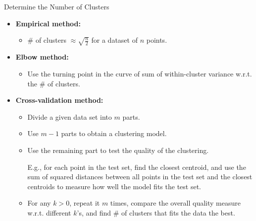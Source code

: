 \begin{frame}{Determine the Number of Clusters}
	\begin{itemize}
		\item \textbf{Empirical method:}
		\begin{itemize}
			\item $\#$ of clusters $\approx \sqrt{\frac{n}{2}}$ for a dataset
			of $n$ points.
		\end{itemize}
		\item \textbf{Elbow method:}
		\begin{itemize}
			\item Use the turning point in the curve of sum of within-cluster
			variance w.r.t. the $\#$ of clusters.
		\end{itemize}
		\item \textbf{Cross-validation method:}
		\begin{itemize}
			\item Divide a given data set into $m$ parts.
			\item Use $m-1$ parts to obtain a clustering model.
			\item Use the remaining part to test the quality of the clustering.

              E.g., for each point in the test set, find the closest centroid,
              and use the sum of squared distances between all points in the
              test set and the closest centroids to measure how well the model
              fits the test set.
			\item For any $k > 0$, repeat it $m$ times, compare the overall
			quality measure w.r.t. different $k$'s, and find $\#$ of clusters
			that fits the data the best.
		\end{itemize}
	\end{itemize}
\end{frame}


